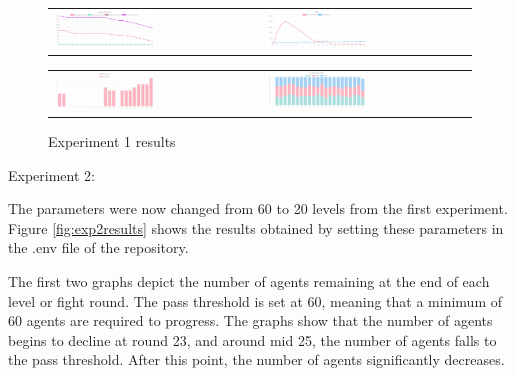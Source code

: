 \begin{figure}[htbp]
\begin{tabular}{ll}
    \centering
    \includegraphics[width=0.5\textwidth]{007_team_4_agent_design/figures/EX1_3.jpg}
    &
    \includegraphics[width=0.5\textwidth]{007_team_4_agent_design/figures/EX1_4.jpg}
\end{tabular}
     
\end{figure}


\begin{figure}[htbp]
\begin{tabular}{ll}
    \centering
    \includegraphics[width=0.5\textwidth]{007_team_4_agent_design/figures/EX1_5.jpg}
    &
    \includegraphics[width=0.5\textwidth]{007_team_4_agent_design/figures/EX1_6.jpg}
\end{tabular}
    \caption{Experiment 1 results}
    \label{fig:exp1results}
\end{figure}

\newpage

Experiment 2:
\par The parameters were now changed from 60 to 20 levels from the first experiment. Figure \ref{fig:exp2results} shows the results obtained by setting these parameters in the .env file of the repository. 

The first two graphs depict the number of agents remaining at the end of each level or fight round. The pass threshold is set at 60, meaning that a minimum of 60 agents are required to progress. The graphs show that the number of agents begins to decline at round 23, and around mid 25, the number of agents falls to the pass threshold. After this point, the number of agents significantly decreases.


